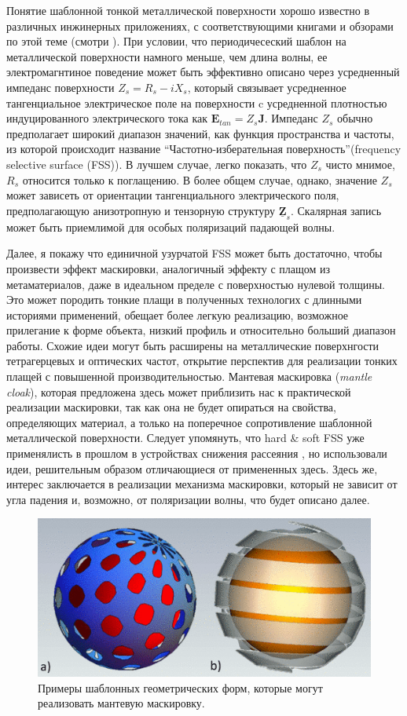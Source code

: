 \documentclass[12pt,a4paper]{article}
\begin{document}
Понятие шаблонной тонкой металлической поверхности хорошо известно в различных инжинерных 
приложениях, с соответствующими книгами и обзорами по этой
теме (смотри \cite{14}). При условии, что периодичесеский шаблон на металлической
поверхности намного меньше, чем длина волны, ее электромагнтиное поведение может
быть эффективно описано через усредненный импеданс поверхности $Z_s = R_s - iX_s$,
который связывает усредненное тангенциальное электрическое поле на поверхности c 
усредненной плотностью индуцированного электрического тока как $\textbf{E}_{tan}=
Z_s\textbf{J}$. Импеданс $Z_s$ обычно предполагает широкий диапазон значений, как
функция пространства и частоты, из которой происходит название 
``Частотно-изберательная поверхность''(frequency selective surface (FSS)). 
В лучшем случае, легко показать, что $Z_s$ чисто мнимое, $R_s$
относится только к поглащению. В более общем случае, однако, значение $Z_s$ может зависеть 
от ориентации
тангенциального электрического поля, предполагающую анизотропную и тензорную структуру 
$\underline{\textbf{Z}}_s$. Скалярная запись может быть приемлимой для особых поляризаций падающей волны.

Далее, я покажу что единичной узурчатой FSS может быть достаточно, чтобы произвести эффект маскировки,
аналогичный эффекту с плащом из метаматериалов, даже в идеальном пределе с поверхностью нулевой толщины.
Это может породить тонкие плащи в полученных технологих с длинными историями применений,
обещает более легкую реализацию, возможное прилегание к форме объекта, низкий профиль и относительно
больший диапазон работы. Схожие идеи могут быть расширены на металлические поверхнгости тетрагерцевых
и оптических частот, открытие перспектив для реализации тонких плащей с повышенной производительностью.
Мантевая маскировка (\textit{mantle cloak}), которая предложена здесь может приблизить нас к практической
реализации маскировки, так как она не будет опираться на свойства, определяющих материал, а только на
поперечное сопротивление шаблонной металлической поверхности. Следует упомянуть, что hard \& soft
FSS уже применялисть в прошлом в устройствах снижения рассеяния \cite{15}, но использовали идеи,
решительным образом отличающиеся от примененных здесь. Здесь же, интерес заключается в реализации
механизма маскировки, который не зависит от угла падения и, возможно, от поляризации волны, что будет
описано далее.

\begin{figure}[t]
  \centering
  \includegraphics[height=0.15\paperheight]{1.png}
  \caption{Примеры шаблонных геометрических форм, которые могут реализовать мантевую 
  маскировку.}
  \label{fig:1}
\end{figure}
\end{document}
